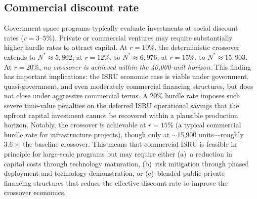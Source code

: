 \subsection{Commercial discount rate}
\label{sec:commercial_rate}

Government space programs typically evaluate investments at social discount rates ($r = 3$--$5\%$). Private or commercial ventures may require substantially higher hurdle rates to attract capital. At $r = 10\%$, the deterministic crossover extends to $N^* \approx 5{,}802$; at $r = 12\%$, to $N^* \approx 6{,}976$; at $r = 15\%$, to $N^* \approx 15{,}903$. At $r = 20\%$, \emph{no crossover is achieved within the 40{,}000-unit horizon}. This finding has important implications: the ISRU economic case is viable under government, quasi-government, and even moderately commercial financing structures, but does not close under aggressive commercial terms. A 20\% hurdle rate imposes such severe time-value penalties on the deferred ISRU operational savings that the upfront capital investment cannot be recovered within a plausible production horizon. Notably, the crossover is achievable at $r = 15\%$ (a typical commercial hurdle rate for infrastructure projects), though only at $\sim$15{,}900 units---roughly $3.6\times$ the baseline crossover. This means that commercial ISRU is feasible in principle for large-scale programs but may require either (a)~a reduction in capital costs through technology maturation, (b)~risk mitigation through phased deployment and technology demonstration, or (c)~blended public-private financing structures that reduce the effective discount rate to improve the crossover economics.

